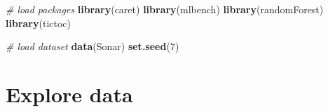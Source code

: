 \documentclass[]{book}
\newenvironment{Shaded}{\begin{snugshade}}{\end{snugshade}}
\newcommand{\CommentTok}[1]{\textcolor[rgb]{0.56,0.35,0.01}{\textit{#1}}}
\newcommand{\DecValTok}[1]{\textcolor[rgb]{0.00,0.00,0.81}{#1}}
\newcommand{\KeywordTok}[1]{\textcolor[rgb]{0.13,0.29,0.53}{\textbf{#1}}}
\newcommand{\NormalTok}[1]{#1}
\begin{document}
\begin{Shaded}
\begin{Highlighting}[]
\CommentTok{# load packages}
\KeywordTok{library}\NormalTok{(caret)}
\KeywordTok{library}\NormalTok{(mlbench)}
\KeywordTok{library}\NormalTok{(randomForest)}
\KeywordTok{library}\NormalTok{(tictoc)}

\CommentTok{# load dataset}
\KeywordTok{data}\NormalTok{(Sonar)}
\KeywordTok{set.seed}\NormalTok{(}\DecValTok{7}\NormalTok{)}
\end{Highlighting}
\end{Shaded}

\hypertarget{explore-data}{%
\section{Explore data}\label{explore-data}}
\end{document}
